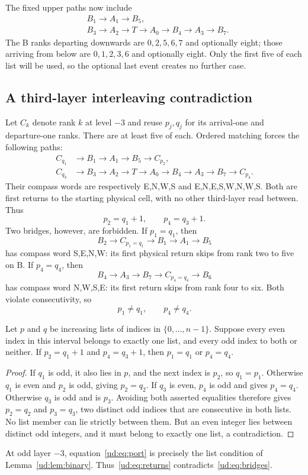 The fixed upper paths now include
\begin{align*}
 &B_1\to A_1\to B_5,\\
 &B_3\to A_2\to T\to A_0\to B_4\to A_3\to B_7.
\end{align*}
The B ranks departing downwards are $0,2,5,6,7$ and optionally eight; those
arriving from below are $0,1,2,3,6$ and optionally eight. Only the first five
of each list will be used, so the optional last event creates no further case.

\subsection{A third-layer interleaving contradiction}\label{ud:sec:interleaving}
Let $C_k$ denote rank $k$ at level $-3$ and reuse $p_j,q_j$ for its arrival-one
and departure-one ranks. There are at least five of each. Ordered matching
forces the following paths:
\begin{align*}
 C_{q_1}&\to B_1\to A_1\to B_5\to C_{p_2},\\
 C_{q_3}&\to B_3\to A_2\to T\to A_0\to B_4\to A_3\to B_7\to C_{p_4}.
\end{align*}
Their compass words are respectively E,N,W,S and E,N,E,S,W,N,W,S. Both are
first returns to the starting physical cell, with no other third-layer read
between. Thus
\begin{equation}\label{ud:eq:returns}
 p_2=q_1+1,\qquad p_4=q_3+1.
\end{equation}
Two bridges, however, are forbidden. If $p_1=q_1$, then
\[
 B_2\to C_{p_1=q_1}\to B_1\to A_1\to B_5
\]
has compass word S,E,N,W: its first physical return skips from rank two to
five on B. If $p_4=q_4$, then
\[
 B_4\to A_3\to B_7\to C_{p_4=q_4}\to B_6
\]
has compass word N,W,S,E: its first return skips from rank four to six.
Both violate consecutivity, so
\begin{equation}\label{ud:eq:bridges}
 p_1\ne q_1,\qquad p_4\ne q_4.
\end{equation}

\begin{lemma}\label{ud:lem:binary}
Let $p$ and $q$ be increasing lists of indices in $\{0,\ldots,n-1\}$.
Suppose every even index in this interval belongs to exactly one list, and
every odd index to both or neither. If $p_2=q_1+1$ and $p_4=q_3+1$,
then $p_1=q_1$ or $p_4=q_4$.
\end{lemma}
\begin{proof}
If $q_1$ is odd, it also lies in $p$, and the next index is $p_2$, so
$q_1=p_1$. Otherwise $q_1$ is even and $p_2$ is odd, giving $p_2=q_2$.
If $q_3$ is even, $p_4$ is odd and gives $p_4=q_4$. Otherwise $q_3$ is odd
and is $p_3$. Avoiding both asserted equalities therefore gives
$p_2=q_2$ and $p_3=q_3$, two distinct odd indices that are consecutive in
both lists. No list member can lie strictly between them. But an even
integer lies between distinct odd integers, and it must belong to exactly
one list, a contradiction.
\end{proof}
At odd layer $-3$, equation~\eqref{ud:eq:port} is precisely the list condition
of Lemma~\ref{ud:lem:binary}. Thus~\eqref{ud:eq:returns} contradicts~\eqref{ud:eq:bridges}.

